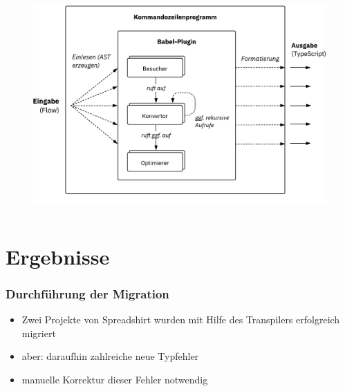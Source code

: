     \begin{frame}[plain]
      \begin{columns}
        \column{\dimexpr\paperwidth-6mm}
        \begin{figure}
          \includegraphics[width=\textwidth]{src/figures/architecture-overview.pdf}
        \end{figure}
      \end{columns}
    \end{frame}


  \section{Ergebnisse}

    \begin{frame}
      \frametitle{Durchführung der Migration}
      \begin{itemize}
        \item Zwei Projekte von Spreadshirt wurden mit Hilfe des Transpilers erfolgreich migriert
        \item aber: daraufhin zahlreiche neue Typfehler
        \item manuelle Korrektur dieser Fehler notwendig
      \end{itemize}
    \end{frame}

